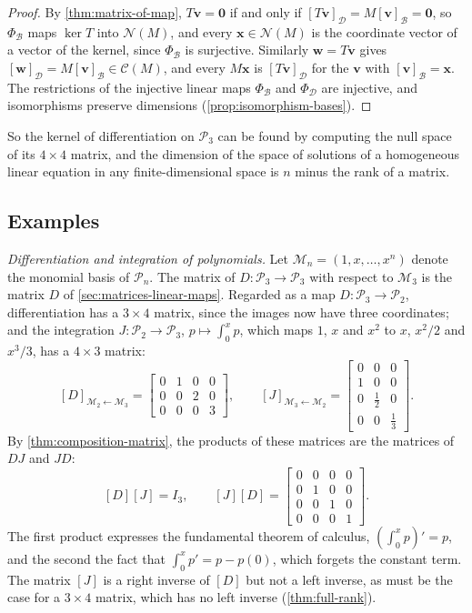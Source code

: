 \begin{proof}
By \cref{thm:matrix-of-map}, $T\mathbf v=\mathbf 0$ if and only if $[T\mathbf v]_{\mathcal D}=M[\mathbf v]_{\mathcal B}=\mathbf 0$, so $\Phi_{\mathcal B}$ maps $\ker T$ into $\mathcal N(M)$, and every $\mathbf x\in\mathcal N(M)$ is the coordinate vector of a vector of the kernel, since $\Phi_{\mathcal B}$ is surjective. Similarly $\mathbf w=T\mathbf v$ gives $[\mathbf w]_{\mathcal D}=M[\mathbf v]_{\mathcal B}\in\mathcal C(M)$, and every $M\mathbf x$ is $[T\mathbf v]_{\mathcal D}$ for the $\mathbf v$ with $[\mathbf v]_{\mathcal B}=\mathbf x$. The restrictions of the injective linear maps $\Phi_{\mathcal B}$ and $\Phi_{\mathcal D}$ are injective, and isomorphisms preserve dimensions (\cref{prop:isomorphism-bases}).
\end{proof}

So the kernel of differentiation on $\mathcal P_3$ can be found by computing the null space of its $4\times4$ matrix, and the dimension of the space of solutions of a homogeneous linear equation in any finite-dimensional space is $n$ minus the rank of a matrix.

\subsection{Examples}

\emph{Differentiation and integration of polynomials.} Let $\mathcal M_n=(1,x,\ldots,x^n)$ denote the monomial basis of $\mathcal P_n$. The matrix of $D\colon\mathcal P_3\to\mathcal P_3$ with respect to $\mathcal M_3$ is the matrix $D$ of \cref{sec:matrices-linear-maps}. Regarded as a map $D\colon\mathcal P_3\to\mathcal P_2$, differentiation has a $3\times4$ matrix, since the images now have three coordinates; and the integration $J\colon\mathcal P_2\to\mathcal P_3$, $p\mapsto\int_0^xp$, which maps $1$, $x$ and $x^2$ to $x$, $x^2/2$ and $x^3/3$, has a $4\times3$ matrix:
\[
[D]_{\mathcal M_2\leftarrow\mathcal M_3}=\begin{bmatrix}0&1&0&0\\0&0&2&0\\0&0&0&3\end{bmatrix},\qquad
[J]_{\mathcal M_3\leftarrow\mathcal M_2}=\begin{bmatrix}0&0&0\\1&0&0\\0&\frac12&0\\0&0&\frac13\end{bmatrix}.
\]
By \cref{thm:composition-matrix}, the products of these matrices are the matrices of $DJ$ and $JD$:
\[
[D][J]=I_3,\qquad[J][D]=\begin{bmatrix}0&0&0&0\\0&1&0&0\\0&0&1&0\\0&0&0&1\end{bmatrix}.
\]
The first product expresses the fundamental theorem of calculus, $(\int_0^xp)'=p$, and the second the fact that $\int_0^xp'=p-p(0)$, which forgets the constant term. The matrix $[J]$ is a right inverse of $[D]$ but not a left inverse, as must be the case for a $3\times4$ matrix, which has no left inverse (\cref{thm:full-rank}).

